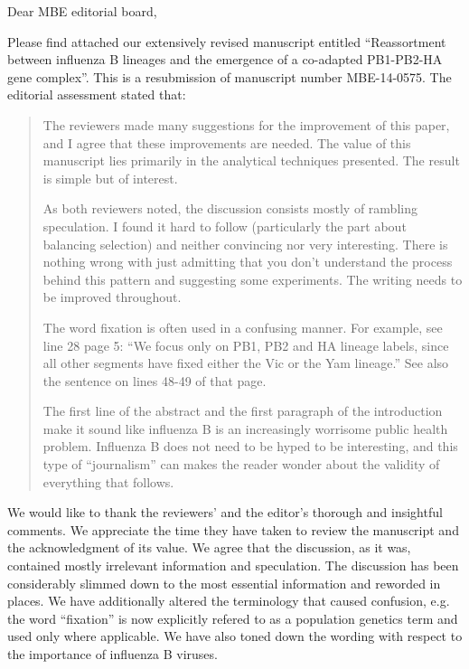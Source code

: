 \documentclass[11pt,oneside,letterpaper]{article}
\begin{document}

Dear MBE editorial board,

Please find attached our extensively revised manuscript entitled ``Reassortment between influenza B lineages and the emergence of a co-adapted PB1-PB2-HA gene complex''.  This is a resubmission of manuscript number MBE-14-0575. The editorial assessment stated that:

\begin{quote}
The reviewers made many suggestions for the improvement of this paper, and I agree that these improvements are needed. 
The value of this manuscript lies primarily in the analytical techniques presented. 
The result is simple but of interest.

As both reviewers noted, the discussion consists mostly of rambling speculation. 
I found it hard to follow (particularly the part about balancing selection) and neither convincing nor very interesting. 
There is nothing wrong with just admitting that you don't understand the process behind this pattern and suggesting some experiments. 
The writing needs to be improved throughout.

The word fixation is often used in a confusing manner. 
For example, see line 28 page 5: ``We focus only on PB1, PB2 and HA lineage labels, since all other segments have fixed either the Vic or the Yam lineage.'' 
See also the sentence on lines 48-49 of that page.

The first line of the abstract and the first paragraph of the introduction make it sound like influenza B is an increasingly worrisome public health problem. 
Influenza B does not need to be hyped to be interesting, and this type of ``journalism'' can makes the reader wonder about the validity of everything that follows.
\end{quote}

We would like to thank the reviewers' and the editor's thorough and insightful comments.
We appreciate the time they have taken to review the manuscript and the acknowledgment of its value.
We agree that the discussion, as it was, contained mostly irrelevant information and speculation.
The discussion has been considerably slimmed down to the most essential information and reworded in places.
We have additionally altered the terminology that caused confusion, e.g. the word ``fixation'' is now explicitly refered to as a population genetics term and used only where applicable.
We have also toned down the wording with respect to the importance of influenza B viruses.
\end{document}
